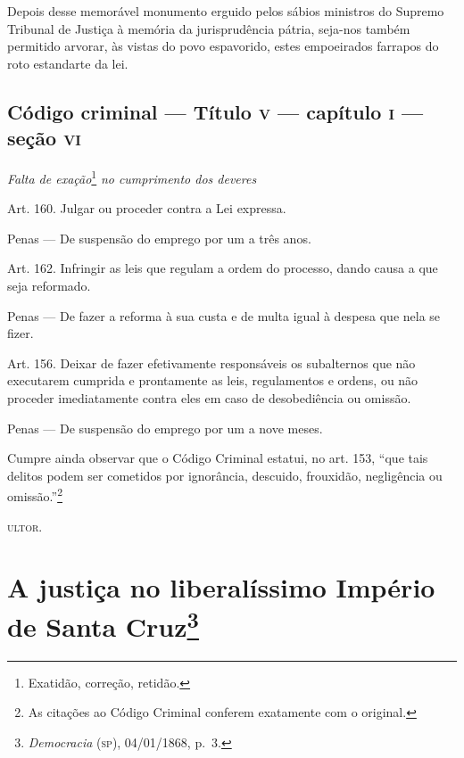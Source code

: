 Depois desse memorável monumento erguido pelos sábios ministros do
Supremo Tribunal de Justiça à memória da jurisprudência pátria, seja-nos
também permitido arvorar, às vistas do povo espavorido, estes
empoeirados farrapos do roto estandarte da lei.

\section{Código criminal --- Título \textsc{v} --- capítulo \textsc{i} --- seção \textsc{vi}}

\emph{Falta de exação}\footnote{Exatidão, correção, retidão.} \emph{no
cumprimento dos deveres}

Art. 160. Julgar ou proceder contra a Lei expressa.

Penas --- De suspensão do emprego por um a três anos.

Art. 162. Infringir as leis que regulam a ordem do processo, dando causa
a que seja reformado.

Penas --- De fazer a reforma à sua custa e de multa igual à despesa que
nela se fizer.

Art. 156. Deixar de fazer efetivamente responsáveis os subalternos que
não executarem cumprida e prontamente as leis, regulamentos e ordens, ou
não proceder imediatamente contra eles em caso de desobediência ou
omissão.

Penas --- De suspensão do emprego por um a nove meses.

Cumpre ainda observar que o Código Criminal estatui, no art. 153, ``que
tais delitos podem ser cometidos por ignorância, descuido, frouxidão,
negligência ou omissão.''\footnote{As citações ao Código Criminal
  conferem exatamente com o original.}

\textsc{ultor}.

\chapter{A justiça no liberalíssimo Império de Santa Cruz\footnote{\emph{Democracia} (\textsc{sp}), 04/01/1868, p.~3.}}

